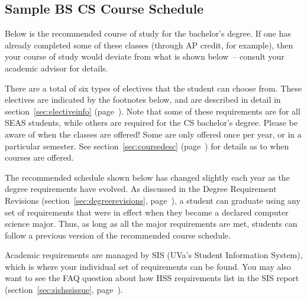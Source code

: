 \documentclass[10pt,letter,twocolumn]{book}
\newcommand{\myurl}[1]{\footnote{\scriptsize\url{#1}}}
\begin{document}
\normalsize

\subsection{Sample BS CS Course Schedule}
\label{sec:bscsschedule}

Below is the recommended course of study for the bachelor's degree. If
one has already completed some of these classes (through AP credit,
for example), then your course of study would deviate from what is
shown below~-- consult your academic advisor for details.

There are a total of six types of electives that the student can
choose from. These electives are indicated by the footnotes below, and
are described in detail in section~\ref{sec:electiveinfo}
(page~\pageref{sec:electiveinfo}). Note that some of these
requirements are for all SEAS students, while others are required for
the CS bachelor's degree. Please be aware of when the classes are
offered! Some are only offered once per year, or in a particular
semester. See section~\ref{sec:coursedesc}
(page~\pageref{sec:coursedesc}) for details as to when courses are
offered.

The recommended schedule shown below has changed slightly each year as
the degree requirements have evolved. As discussed in the Degree
Requirement Revisions (section~\ref{sec:degreerevisions},
page~\pageref{sec:degreerevisions}), a student can graduate using any
set of requirements that were in effect when they became a declared
computer science major. Thus, as long as all the major requirements
are met, students can follow a previous version of the recommended
course schedule.

Academic requirements are managed by SIS (UVa's Student Information
System), which is where your individual set of requirements can be found.
You may also want to see the FAQ question about how HSS requirements
list in the SIS report (section~\ref{sec:sishssissue},
page~\pageref{sec:sishssissue}).


\vspace{0.15in}
\end{document}
